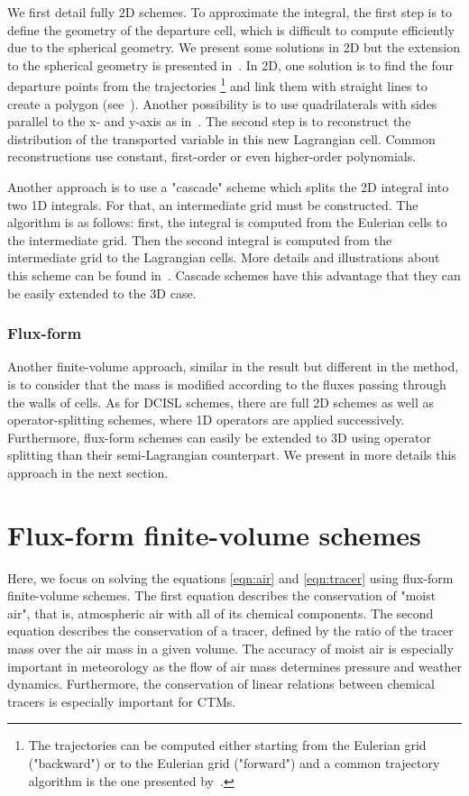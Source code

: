 We first detail fully 2D schemes. To approximate the integral, the first step
is to define the geometry of the departure cell, which is difficult to compute
efficiently due to the spherical geometry. We present some solutions in 2D but
the extension to the spherical geometry is presented in~\cite{Machenhauer2009}.
In 2D, one solution is to find the four departure points from the trajectories%
\footnote{The trajectories can be computed either starting from the
Eulerian grid ("backward") or to the Eulerian grid ("forward") and a common
trajectory algorithm is the one presented by~\cite{Staniforth1991}.}%
and link them with straight lines to
create a polygon (see~\cite{Rancic1992}). Another possibility is to use
quadrilaterals with sides parallel to the x- and y-axis as in~\cite{Nair2002}.
The second step is to reconstruct the distribution of the transported variable
in this new Lagrangian cell. Common reconstructions use constant, first-order or
even higher-order polynomials.

Another approach is to use a "cascade" scheme which splits the 2D integral into
two 1D integrals. For that, an intermediate grid must be constructed. The
algorithm is as follows: first, the integral is computed from the Eulerian cells
to the intermediate grid. Then the second integral is computed from the
intermediate grid to the Lagrangian cells. More details and illustrations about
this scheme can be found in~\cite{Purser1991}. Cascade schemes have this
advantage that they can be easily extended to the 3D case.

\subsubsection{Flux-form}
Another finite-volume approach, similar in the result but different in the
method, is to consider that the mass is modified according to the fluxes passing
through the walls of cells. As for \gls{DCISL} schemes, there are full 2D
schemes as well as operator-splitting schemes, where 1D operators are applied
successively. Furthermore, flux-form schemes can easily be extended to 3D using
operator splitting than their semi-Lagrangian counterpart. We present in more
details this approach in the next section.

\section{Flux-form finite-volume schemes}
\label{sec:fv_schemes}
Here, we focus on solving the equations \eqref{eqn:air} and \eqref{eqn:tracer}
using flux-form finite-volume schemes. The first equation describes the
conservation of "moist air", that is, atmospheric air with all of its chemical
components. The second equation describes the conservation of a tracer, defined
by the ratio of the tracer mass over the air mass in a given volume. The
accuracy of moist air is especially important in meteorology as the flow of air
mass determines pressure and weather dynamics. Furthermore, the conservation of
linear relations between chemical tracers is especially important for
\gls{CTM}s.

